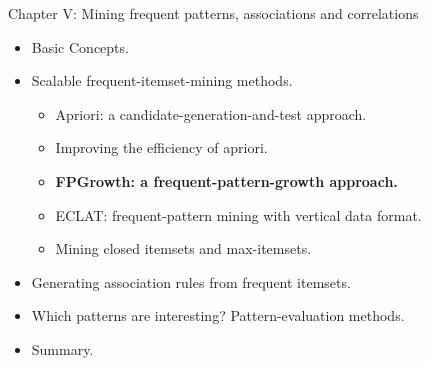 \documentclass[aspectratio=169,t,xcolor=dvipsnames]{beamer}
\begin{document}
  {
    \begin{frame}{Chapter V: Mining frequent patterns, associations and correlations}
        \begin{itemize}
            \item Basic Concepts.
            \item Scalable frequent-itemset-mining methods.
            \begin{itemize}
              \item Apriori: a candidate-generation-and-test approach.
              \item Improving the efficiency of apriori.
              \item \textbf{FPGrowth:  a frequent-pattern-growth approach.}
              \item ECLAT: frequent-pattern mining with vertical data format.
              \item Mining closed itemsets and max-itemsets.
            \end{itemize}
            \item Generating association rules from frequent itemsets.
            \item Which patterns are interesting? Pattern-evaluation methods.
            \item Summary.
        \end{itemize}
    \end{frame}
  }
\end{document}
